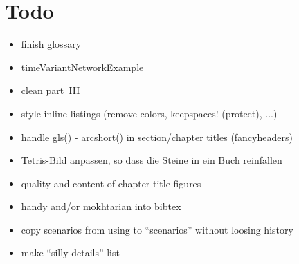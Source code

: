\section*{Todo}

\begin{itemize}\styleItemize

\item finish glossary

\item timeVariantNetworkExample

\item clean part~III

\item style inline listings (remove colors, keepspaces! (protect), ...)

\item handle gls() - arcshort() in section/chapter titles (fancyheaders)

\item Tetris-Bild anpassen, so dass die Steine in ein Buch reinfallen

\item quality and content of chapter title figures

\item handy and/or mokhtarian into bibtex

\item copy scenarios from using to ``scenarios'' without loosing history

\item make ``silly details'' list








\end{itemize}